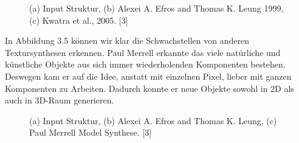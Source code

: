 \documentclass[12pt]{report}
\begin{document}
\begin{figure}[H]
    \centering
    \qquad
    \qquad
    \caption{(a) Input Struktur, (b) Alexei A. Efros and Thomas K. Leung 1999, (c) Kwatra et al., 2005. [3]}%
\end{figure}

In Abbildung 3.5 können wir klar die Schwachstellen von anderen Textursynthesen erkennen.
\newline
Paul Merrell erkannte das viele natürliche und künstliche Objekte aus sich immer wiederholenden Komponenten bestehen.
Deswegen kam er auf die Idee, anstatt mit einzelnen Pixel, lieber mit ganzen Komponenten zu Arbeiten.
Dadurch konnte er neue Objekte sowohl in 2D als auch in 3D-Raum generieren.

\begin{figure}[H]
    \centering
    \qquad
    \qquad
    \caption{(a) Input Struktur, (b) Alexei A. Efros and Thomas K. Leung, (c) Paul Merrell Model Synthese. [3]}%
\end{figure}
\end{document}
